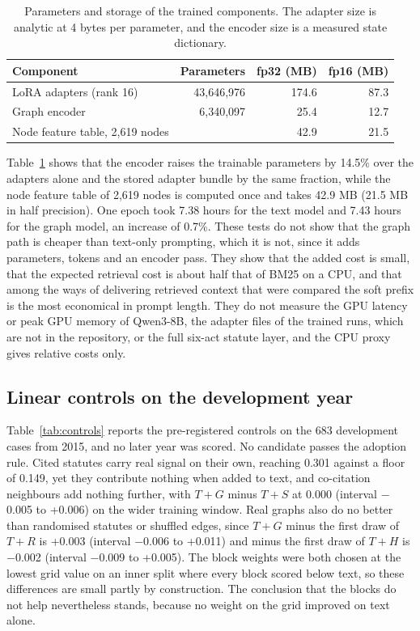 \documentclass[journal]{IEEEtran}
\begin{document}
\begin{table}[!t]\centering\footnotesize
\setlength{\tabcolsep}{4pt}
\caption{Parameters and storage of the trained components. The adapter size is analytic at 4 bytes per parameter, and the encoder size is a measured state dictionary.}\label{tab:storage}
\begin{tabular}{@{}lrrr@{}}\toprule
Component & Parameters & fp32 (MB) & fp16 (MB)\\\midrule
LoRA adapters (rank 16) & 43,646,976 & 174.6 & 87.3\\
Graph encoder & 6,340,097 & 25.4 & 12.7\\
Node feature table, 2,619 nodes & & 42.9 & 21.5\\\bottomrule
\end{tabular}\end{table}

Table~\ref{tab:storage} shows that the encoder raises the trainable parameters by 14.5\% over the adapters alone and the stored adapter bundle by the same fraction, while the node feature table of 2,619 nodes is computed once and takes 42.9 MB (21.5 MB in half precision). One epoch took 7.38 hours for the text model and 7.43 hours for the graph model, an increase of 0.7\%. These tests do not show that the graph path is cheaper than text-only prompting, which it is not, since it adds parameters, tokens and an encoder pass. They show that the added cost is small, that the expected retrieval cost is about half that of BM25 on a CPU, and that among the ways of delivering retrieved context that were compared the soft prefix is the most economical in prompt length. They do not measure the GPU latency or peak GPU memory of Qwen3-8B, the adapter files of the trained runs, which are not in the repository, or the full six-act statute layer, and the CPU proxy gives relative costs only.

\subsection{Linear controls on the development year}\label{sec:controls}
Table~\ref{tab:controls} reports the pre-registered controls on the 683 development cases from 2015, and no later year was scored. No candidate passes the adoption rule. Cited statutes carry real signal on their own, reaching 0.301 against a floor of 0.149, yet they contribute nothing when added to text, and co-citation neighbours add nothing further, with $T{+}G$ minus $T{+}S$ at 0.000 (interval $-$0.005 to +0.006) on the wider training window. Real graphs also do no better than randomised statutes or shuffled edges, since $T{+}G$ minus the first draw of $T{+}R$ is +0.003 (interval $-$0.006 to +0.011) and minus the first draw of $T{+}H$ is $-$0.002 (interval $-$0.009 to +0.005). The block weights were both chosen at the lowest grid value on an inner split where every block scored below text, so these differences are small partly by construction. The conclusion that the blocks do not help nevertheless stands, because no weight on the grid improved on text alone.
\end{document}
